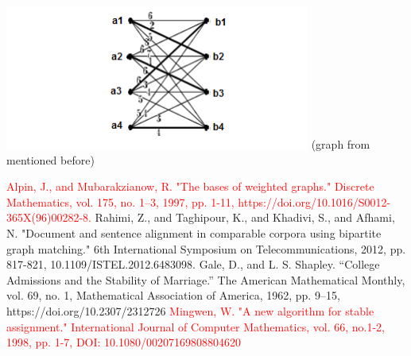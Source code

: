 \documentclass[letterpaper,11pt,twocolumn]{article}
\begin{document}
\includegraphics{graph.png} (graph from \cite{image} mentioned before)



\begin{thebibliography}{2}
\textcolor{red}{Alpin, J., and Mubarakzianow, R. "The bases of weighted graphs." Discrete Mathematics, vol. 175, no. 1–3, 1997, pp. 1-11, https://doi.org/10.1016/S0012-365X(96)00282-8.}
Rahimi, Z., and Taghipour, K., and Khadivi, S., and Afhami, N. "Document and sentence alignment in comparable corpora using bipartite graph matching." 6th International Symposium on Telecommunications, 2012, pp. 817-821, 10.1109/ISTEL.2012.6483098. 
Gale, D., and L. S. Shapley. “College Admissions and the Stability of Marriage.” The American Mathematical Monthly, vol. 69, no. 1, Mathematical Association of America, 1962, pp. 9–15, https://doi.org/10.2307/2312726
\textcolor{red}{Mingwen, W. "A new algorithm for stable assignment." International Journal of Computer Mathematics, vol. 66, no.1-2, 1998, pp. 1-7, DOI: 10.1080/00207169808804620}
\end{thebibliography}
\end{document}
